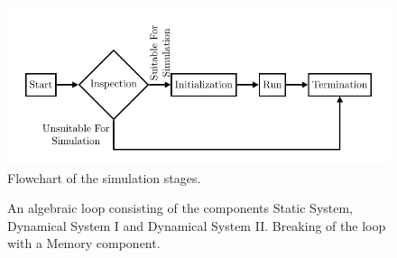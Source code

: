 \begin{figure}
    \centering
    \includegraphics[width=\linewidth]{figures/FlowChart/flowchart.pdf}
    \caption{Flowchart of the simulation stages.}
    \label{fig: flowchart}
\end{figure}

\begin{figure}
    \centering
    \caption{\protect{} An algebraic loop consisting of the components Static System, Dynamical System I and Dynamical System II. \protect{} Breaking of the loop with a Memory component. }
    \label{fig: algebraic loop}
\end{figure}

